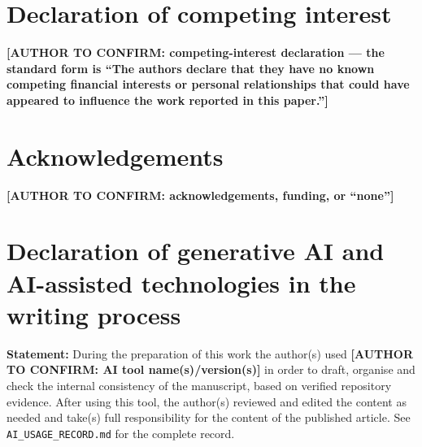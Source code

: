 \documentclass[preprint,12pt, a4paper]{elsarticle}
\begin{document}

\section*{Declaration of competing interest}
\textbf{[AUTHOR TO CONFIRM: competing-interest declaration --- the standard
form is ``The authors declare that they have no known competing financial
interests or personal relationships that could have appeared to influence the
work reported in this paper.'']}

\section*{Acknowledgements}
\textbf{[AUTHOR TO CONFIRM: acknowledgements, funding, or ``none'']}


\section*{Declaration of generative AI and AI-assisted technologies in the
writing process}
\textbf{Statement:} During the preparation of this work the author(s) used
\textbf{[AUTHOR TO CONFIRM: AI tool name(s)/version(s)]} in order to draft,
organise and check the internal consistency of the manuscript, based on
verified repository evidence. After using this tool, the author(s) reviewed
and edited the content as needed and take(s) full responsibility for the
content of the published article. See \texttt{AI\_USAGE\_RECORD.md} for the
complete record.





\end{document}

